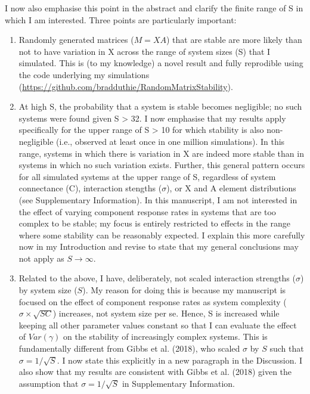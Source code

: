 \documentclass[]{article}
\begin{document}
I now also emphasise this point in the abstract and clarify the finite
range of S in which I am interested. Three points are particularly
important:

\begin{enumerate}
\def\labelenumi{(\arabic{enumi})}
\item
  Randomly generated matrices (\(M = XA\)) that are stable are more
  likely than not to have variation in X across the range of system
  sizes (S) that I simulated. This is (to my knowledge) a novel result
  and fully reprodible using the code underlying my simulations
  (\url{https://github.com/bradduthie/RandomMatrixStability}).
\item
  At high S, the probability that a system is stable becomes negligible;
  no such systems were found given S \textgreater{} 32. I now emphasise
  that my results apply specifically for the upper range of S
  \textgreater{} 10 for which stability is also non-negligible (i.e.,
  observed at least once in one million simulations). In this range,
  systems in which there is variation in X are indeed more stable than
  in systems in which no such variation exists. Further, this general
  pattern occurs for all simulated systems at the upper range of S,
  regardless of system connectance (C), interaction stengths
  (\(\sigma\)), or X and A element distributions (see Supplementary
  Information). In this manuscript, I am not interested in the effect of
  varying component response rates in systems that are too complex to be
  stable; my focus is entirely restricted to effects in the range where
  some stability can be reasonably expected. I explain this more
  carefully now in my Introduction and revise to state that my general
  conclusions may not apply as \(S \to \infty\).
\item
  Related to the above, I have, deliberately, not scaled interaction
  strengths (\(\sigma\)) by system size (\(S\)). My reason for doing
  this is because my manuscript is focused on the effect of component
  response rates as system complexity (\(\sigma \times \sqrt{SC}\))
  increases, not system size per se. Hence, S is increased while keeping
  all other parameter values constant so that I can evaluate the effect
  of \(Var(\gamma)\) on the stability of increasingly complex systems.
  This is fundamentally different from Gibbs et al. (2018), who scaled
  \(\sigma\) by \(S\) such that \(\sigma = 1/ \sqrt{S}\). I now state
  this explicitly in a new paragraph in the Discussion. I also show that
  my results are consistent with Gibbs et al. (2018) given the
  assumption that \(\sigma = 1/ \sqrt{S}\) in Supplementary Information.
\end{enumerate}
\end{document}

